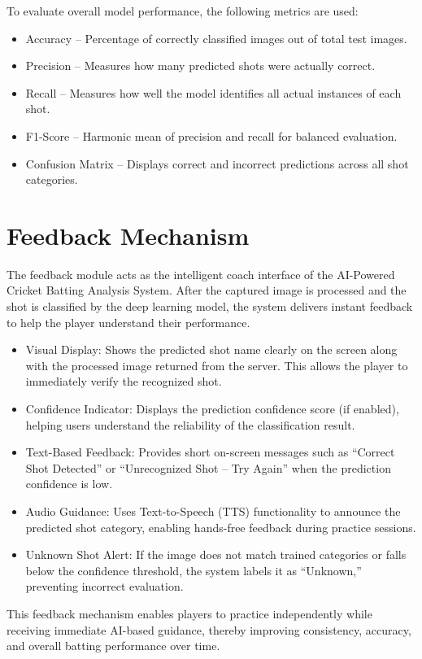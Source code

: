 To evaluate overall model performance, the following metrics are used:
\begin{itemize}
	\item Accuracy – Percentage of correctly classified images out of total test images.
	\item Precision – Measures how many predicted shots were actually correct.
	\item Recall – Measures how well the model identifies all actual instances of each shot.
	\item F1-Score – Harmonic mean of precision and recall for balanced evaluation.
	\item Confusion Matrix – Displays correct and incorrect predictions across all shot categories.
\end{itemize}

\section{Feedback Mechanism} \label{S4.8}
	
The feedback module acts as the intelligent coach interface of the AI-Powered Cricket Batting Analysis System. After the captured image is processed and the shot is classified by the deep learning model, the system delivers instant feedback to help the player understand their performance.
\begin{itemize}
    \item Visual Display: Shows the predicted shot name clearly on the screen along with the processed image returned from the server. This allows the player to immediately verify the recognized shot.
	\item Confidence Indicator: Displays the prediction confidence score (if enabled), helping users understand the reliability of the classification result.
	\item Text-Based Feedback: Provides short on-screen messages such as “Correct Shot Detected” or “Unrecognized Shot – Try Again” when the prediction confidence is low.
	\item Audio Guidance: Uses Text-to-Speech (TTS) functionality to announce the predicted shot category, enabling hands-free feedback during practice sessions.
    \item Unknown Shot Alert: If the image does not match trained categories or falls below the confidence threshold, the system labels it as “Unknown,” preventing incorrect evaluation.
\end{itemize}
This feedback mechanism enables players to practice independently while receiving immediate AI-based guidance, thereby improving consistency, accuracy, and overall batting performance over time.

